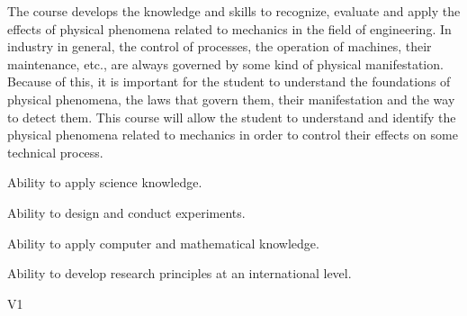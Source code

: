 \begin{syllabus}


\begin{justification}
   The course develops the knowledge and skills to recognize, evaluate and apply the effects of physical phenomena related to mechanics in the field of engineering. In industry in general, the control of processes, the operation of machines, their maintenance, etc., are always governed by some kind of physical manifestation. Because of this, it is important for the student to understand the foundations of physical phenomena, the laws that govern them, their manifestation and the way to detect them. This course will allow the student to understand and identify the physical phenomena related to mechanics in order to control their effects on some technical process. 
\end{justification}

\begin{goals}
\item Ability to apply science knowledge.
\item Ability to design and conduct experiments.
\item Ability to apply computer and mathematical knowledge.
\item Ability to develop research principles at an international level.
\end{goals}

\begin{competences}{V1}
  \item {} 
  \item {}
  \item {}
\end{competences}


\end{syllabus}
